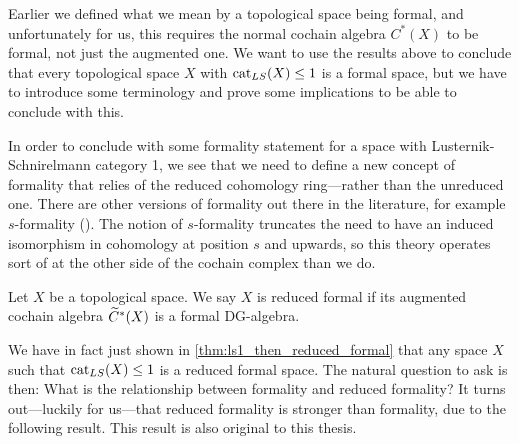 Earlier we defined what we mean by a topological space being formal, and unfortunately for us, this requires the normal cochain algebra $C^*(X)$ to be formal, not just the augmented one. We want to use the results above to conclude that every topological space $X$ with $\text{cat}_{LS}(X)\leq 1$ is a formal space, but we have to introduce some terminology and prove some implications to be able to conclude with this. 

In order to conclude with some formality statement for a space with Lusternik-Schnirelmann category 1, we see that we need to define a new concept of formality that relies of the reduced cohomology ring---rather than the unreduced one. There are other versions of formality out there in the literature, for example $s$-formality (\cite{sformality}). The notion of $s$-formality truncates the need to have an induced isomorphism in cohomology at position $s$ and upwards, so this theory operates sort of at the other side of the cochain complex than we do. 

\begin{definition}
\label{def:reduced_formal_space}
Let $X$ be a topological space. We say $X$ is reduced formal if its augmented cochain algebra $\widetilde{C}^*(X)$ is a formal DG-algebra. 
\end{definition}

We have in fact just shown in \cref{thm:ls1_then_reduced_formal} that any space $X$ such that $\text{cat}_{LS}(X)\leq 1$ is a reduced formal space. The natural question to ask is then: What is the relationship between formality and reduced formality? It turns out---luckily for us---that reduced formality is stronger than formality, due to the following result. This result is also original to this thesis. 

